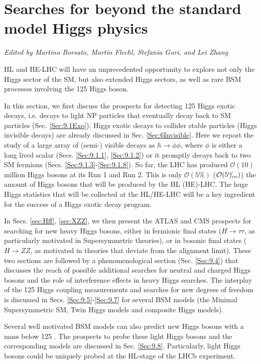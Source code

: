 \documentclass[../report.tex]{subfiles}
\begin{document}
\section{Searches for beyond the standard model Higgs physics\label{sec9}}

\begin{center}
    {\it{Edited by Martino Borsato, Martin Flechl, Stefania Gori, and Lei Zhang}}
\end{center}
HL and HE-LHC will have an unprecedented opportunity to explore not only the Higgs sector of the SM, but also extended Higgs sectors, as well as rare BSM processes involving the 125 \UGeV Higgs boson. 

In this section, we first discuss the prospects for detecting 125 \UGeV Higgs exotic decays, i.e. decays to light NP particles that eventually decay back to SM particles (Sec. \ref{Sec:9.1Exo}). Higgs exotic decays to collider stable particles (Higgs invisible decays) are already discussed in Sec. \ref{Sec:6Invisible}. Here we report the study of a large array of (semi-) visible decays as $h\to \phi\phi$, where $\phi$ is either a long lived scalar (Secs. \ref{Sec:9.1.1}, \ref{Sec:9.1.2}) or it promptly decays back to two SM fermions (Secs. \ref{Sec:9.1.3}-\ref{Sec:9.1.8}). So far, the LHC has produced $\mathcal O(10)$ million Higgs bosons at its Run 1 and Run 2. This is only $\mathcal O(5\%)$ ($\mathcal O(5{}^\text{o}\mkern-5mu/\mkern-3mu_\text{oo})$) the amount of Higgs bosons that will be produced by the HL (HE)-LHC. The huge Higgs statistics that will be collected at the HL/HE-LHC will be a key ingredient for the success of a Higgs exotic decay program. 

In Secs. \ref{sec:Hff}, \ref{sec:XZZ}, we then present the ATLAS and CMS prospects for searching for new heavy Higgs bosons, either in fermionic final states ($H\to\tau\tau$, as particularly motivated in Supersymmetric theories), or in bosonic final states ($H\to ZZ$, as motivated in theories that deviate from the alignment limit). These two sections are followed by a phenomenological section (Sec. \ref{Sec:9.4}) that discusses the reach of possible additional searches for neutral and charged Higgs bosons and the role of interference effects in heavy Higgs searches. The interplay of the 125 Higgs coupling measurements and searches for new degrees of freedom is discussed in Secs. \ref{Sec:9.5}-\ref{Sec:9.7} for several BSM models (the Minimal Supersymmetric SM, Twin Higgs models and composite Higgs models). 

Several well motivated BSM models can also predict new Higgs bosons with a mass below 125 \UGeV. The prospects to probe these light Higgs bosons and the corresponding models are discussed in Sec. \ref{Sec:9.8}. Particularly, light Higgs bosons could be uniquely probed at the HL-stage of the LHCb experiment.
\end{document}
